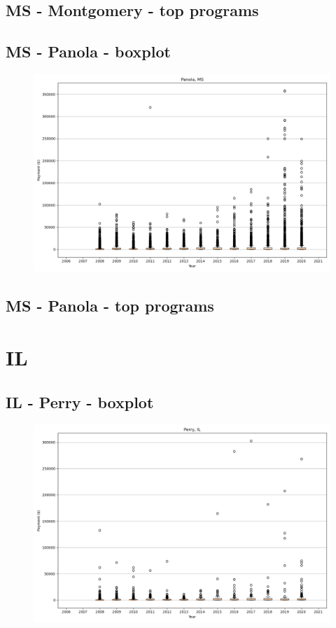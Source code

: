 \subsection*{MS - Montgomery - top programs}

\newpage
\subsection*{MS - Panola - boxplot}
\begin{figure}[h]
\centering
\includegraphics[width=7in]{../output/boxplots/counties/Panola-MS_boxplot.png}
\end{figure}


\subsection*{MS - Panola - top programs}

\newpage
\section*{IL}
\subsection*{IL - Perry - boxplot}
\begin{figure}[h]
\centering
\includegraphics[width=7in]{../output/boxplots/counties/Perry-IL_boxplot.png}
\end{figure}


